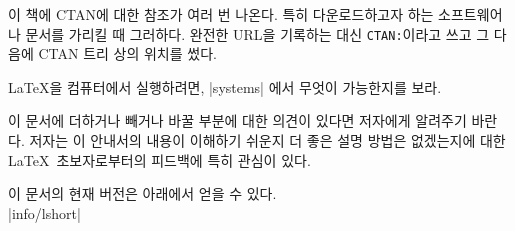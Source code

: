 이 책에 CTAN에 대한 참조가 여러 번 나온다. 특히 다운로드하고자 하는 소프트웨어나 문서를
가리킬 때 그러하다. 완전한 URL을 기록하는 대신 \texttt{CTAN:}이라고 쓰고 그 다음에
CTAN 트리 상의 위치를 썼다.

\LaTeX{}을 컴퓨터에서 실행하려면,  \CTAN|systems| 에서 무엇이 가능한지를 보라.

\noindent 이 문서에 더하거나 빼거나 바꿀  부분에 대한 의견이 있다면
저자에게 알려주기 바란다. 저자는 이 안내서의 내용이 이해하기 쉬운지 더 좋은 설명 방법은 없겠는지에
대한 \LaTeX\ 초보자로부터의 피드백에 특히 관심이 있다.

\bigskip
\begin{verse}
%
\end{verse}
\noindent 이 문서의 현재 버전은 아래에서 얻을 수 있다.\\
\CTAN|info/lshort|

\endinput



%

